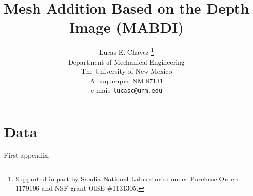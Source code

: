\documentclass{eeceTR}
\title{Mesh Addition Based on the Depth Image (MABDI)}
\author{Lucas E. Chavez \thanks{Supported in part by Sandia National Laboratories under Purchase Order: 1179196 and  NSF grant OISE \#1131305.}\\
Department of Mechanical Engineering\\
The University of New Mexico\\
Albuquerque, NM 87131\\
e-mail: {\tt lucasc@unm.edu}
}
\begin{document}
\maketitle
\makeabstract














\appendix

\section{Data}
First appendix.



\end{document}
